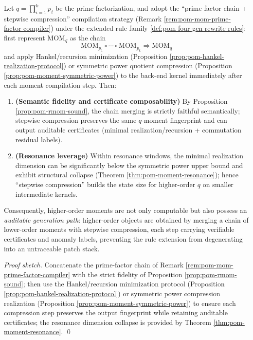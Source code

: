\begin{theorem}\label{thm:pom-prime-factor-moment-compiler-resonance}
Let \(q=\prod_{i=1}^{k}p_i\) be the prime factorization, and adopt the ``prime-factor chain + stepwise compression'' compilation strategy (Remark \ref{rem:pom-mom-prime-factor-compiler}) under the extended rule family \ref{def:pom-four-gen-rewrite-rules}:
first represent \(\mathrm{MOM}_q\) as the chain
\[
\mathrm{MOM}_{p_1}\circ\cdots\circ \mathrm{MOM}_{p_k}\Rightarrow \mathrm{MOM}_q
\]
and apply Hankel/recursion minimization (Proposition \ref{prop:pom-hankel-realization-protocol}) or symmetric power quotient compression (Proposition \ref{prop:pom-moment-symmetric-power}) to the back-end kernel immediately after each moment compilation step.
Then:
\begin{enumerate}
  \item \textbf{(Semantic fidelity and certificate composability)} By Proposition \ref{prop:pom-rmom-sound}, the chain merging is strictly faithful semantically; stepwise compression preserves the same \(q\)-moment fingerprint and can output auditable certificates (minimal realization/recursion + commutation residual labels).
  \item \textbf{(Resonance leverage)} Within resonance windows, the minimal realization dimension can be significantly below the symmetric power upper bound and exhibit structural collapse (Theorem \ref{thm:pom-moment-resonance}); hence ``stepwise compression'' builds the state size for higher-order \(q\) on smaller intermediate kernels.
\end{enumerate}
Consequently, higher-order moments are not only computable but also possess an \emph{auditable generation path}: higher-order objects are obtained by merging a chain of lower-order moments with stepwise compression, each step carrying verifiable certificates and anomaly labels, preventing the rule extension from degenerating into an untraceable patch stack.
\end{theorem}

\begin{proof}[Proof sketch]
Concatenate the prime-factor chain of Remark \ref{rem:pom-mom-prime-factor-compiler} with the strict fidelity of Proposition \ref{prop:pom-rmom-sound};
then use the Hankel/recursion minimization protocol (Proposition \ref{prop:pom-hankel-realization-protocol}) or symmetric power compression realization (Proposition \ref{prop:pom-moment-symmetric-power}) to ensure each compression step preserves the output fingerprint while retaining auditable certificates;
the resonance dimension collapse is provided by Theorem \ref{thm:pom-moment-resonance}. \qed
\end{proof}

